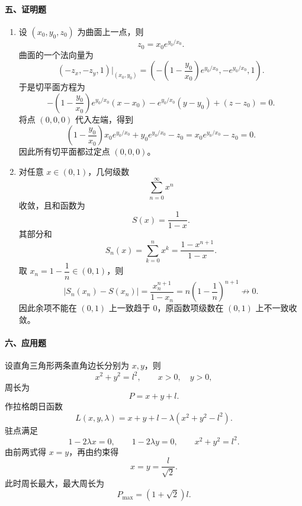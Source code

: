 \paragraph*{五、证明题}
\begin{enumerate}
  \item 设 $(x_0,y_0,z_0)$ 为曲面上一点，则
  \[
    z_0=x_0e^{y_0/x_0}.
  \]
  曲面的一个法向量为
  \[
    \left(-z_x,-z_y,1\right)\bigg|_{(x_0,y_0)}
    =
    \left(
      -\left(1-\frac{y_0}{x_0}\right)e^{y_0/x_0},
      -e^{y_0/x_0},
      1
    \right).
  \]
  于是切平面方程为
  \[
    -\left(1-\frac{y_0}{x_0}\right)e^{y_0/x_0}(x-x_0)
    -e^{y_0/x_0}(y-y_0)
    +(z-z_0)=0.
  \]
  将点 $(0,0,0)$ 代入左端，得到
  \[
    \left(1-\frac{y_0}{x_0}\right)x_0e^{y_0/x_0}
    +y_0e^{y_0/x_0}-z_0
    =
    x_0e^{y_0/x_0}-z_0=0.
  \]
  因此所有切平面都过定点 $(0,0,0)$。

  \item 对任意 $x\in(0,1)$，几何级数
  \[
    \sum_{n=0}^{\infty}x^n
  \]
  收敛，且和函数为
  \[
    S(x)=\frac1{1-x}.
  \]
  其部分和
  \[
    S_n(x)=\sum_{k=0}^{n}x^k=\frac{1-x^{n+1}}{1-x}.
  \]
  取 $x_n=1-\dfrac1n\in(0,1)$，则
  \[
    |S_n(x_n)-S(x_n)|
    =
    \frac{x_n^{n+1}}{1-x_n}
    =
    n\left(1-\frac1n\right)^{n+1}\not\to0.
  \]
  因此余项不能在 $(0,1)$ 上一致趋于 $0$，原函数项级数在 $(0,1)$ 上不一致收敛。
\end{enumerate}

\paragraph*{六、应用题}
设直角三角形两条直角边长分别为 $x,y$，则
\[
  x^2+y^2=l^2,\qquad x>0,\quad y>0,
\]
周长为
\[
  P=x+y+l.
\]
作拉格朗日函数
\[
  L(x,y,\lambda)=x+y+l-\lambda(x^2+y^2-l^2).
\]
驻点满足
\[
  1-2\lambda x=0,\qquad 1-2\lambda y=0,\qquad x^2+y^2=l^2.
\]
由前两式得 $x=y$，再由约束得
\[
  x=y=\frac{l}{\sqrt2}.
\]
此时周长最大，最大周长为
\[
  P_{\max}=(1+\sqrt2)l.
\]

